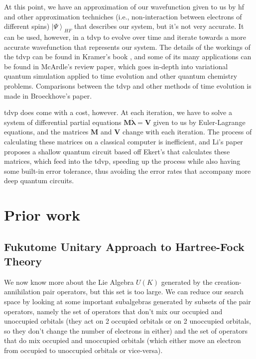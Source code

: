 \documentclass{aux/ttuthes2007}
\newcommand{\ket}[1]{\ensuremath{\left|#1\right\rangle}}
\newcommand{\orb}{K}
\begin{document}
	At this point, we have an approximation of our wavefunction given to us by \gls{hf} and other approximation techniches (i.e., non-interaction between electrons of different spins) $\ket\Psi_{HF}$ that describes our system, but it's not very accurate. It can be used, however, in a \gls{tdvp} to evolve over time and iterate towards a more accurate wavefunction that represents our system. The details of the workings of the \gls{tdvp} can be found in Kramer's book , and some of its many applications can be found in McArdle's  review paper, which goes in-depth into variational quantum simulation applied to time evolution and other quantum chemistry problems. Comparisons between the \gls{tdvp} and other methods of time evolution is made in Broeckhove's  paper.

	\gls{tdvp} does come with a cost, however. At each iteration, we have to solve a system of differential partial equations $\bm M \dot {\bm \lambda} = \bm V$ given to us by Euler-Lagrange equations, and the matrices $\bm M$ and $\bm V$ change with each iteration. The process of calculating these matrices on a classical computer is inefficient, and Li's paper  proposes a shallow quantum circuit based off Ekert's  that calculates these matrices, which feed into the \gls{tdvp}, speeding up the process while also having some built-in error tolerance, thus avoiding the error rates that accompany more deep quantum circuits.

\section{\textbf{Prior work}}

\subsection {\textbf{Fukutome Unitary Approach to Hartree-Fock Theory}}

We now know more about the Lie Algebra $U(\orb)$ generated by the creation-annihilation pair operators, but this set is too large.
We can reduce our search space by looking at some important subalgebras generated by subsets of the pair operators, namely the set of operators that don't mix our occupied and unoccupied orbitals (they act on 2 occupied orbitals or on 2 unoccupied orbitals, so they don't change the number of electrons in either) and the set of operators that do mix occupied and unoccupied orbitals (which either move an electron from occupied to unoccupied orbitals or vice-versa).
\end{document}
